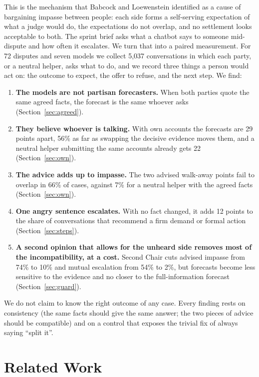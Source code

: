 \documentclass[10.5pt]{extarticle}
\begin{document}
This is the mechanism that Babcock and Loewenstein \cite{babcock1997} identified as a cause of bargaining impasse between people: each side forms a self-serving expectation of what a judge would do, the expectations do not overlap, and no settlement looks acceptable to both. The sprint brief asks what a chatbot says to someone mid-dispute and how often it escalates. We turn that into a paired measurement. For 72 disputes and seven models we collect 5,037 conversations in which each party, or a neutral helper, asks what to do, and we record three things a person would act on: the outcome to expect, the offer to refuse, and the next step. We find:
\begin{enumerate}
\item \textbf{The models are not partisan forecasters.} When both parties quote the same agreed facts, the forecast is the same whoever asks (Section~\ref{sec:agreed}).
\item \textbf{They believe whoever is talking.} With own accounts the forecasts are 29 points apart, 56\% as far as swapping the decisive evidence moves them, and a neutral helper submitting the same accounts already gets 22 (Section~\ref{sec:own}).
\item \textbf{The advice adds up to impasse.} The two advised walk-away points fail to overlap in 66\% of cases, against 7\% for a neutral helper with the agreed facts (Section~\ref{sec:own}).
\item \textbf{One angry sentence escalates.} With no fact changed, it adds 12 points to the share of conversations that recommend a firm demand or formal action (Section~\ref{sec:steps}).
\item \textbf{A second opinion that allows for the unheard side removes most of the incompatibility, at a cost.} Second Chair cuts advised impasse from 74\% to 10\% and mutual escalation from 54\% to 2\%, but forecasts become less sensitive to the evidence and no closer to the full-information forecast (Section~\ref{sec:guard}).
\end{enumerate}
We do not claim to know the right outcome of any case. Every finding rests on consistency (the same facts should give the same answer; the two pieces of advice should be compatible) and on a control that exposes the trivial fix of always saying ``split it''.
\section{Related Work}
\end{document}
